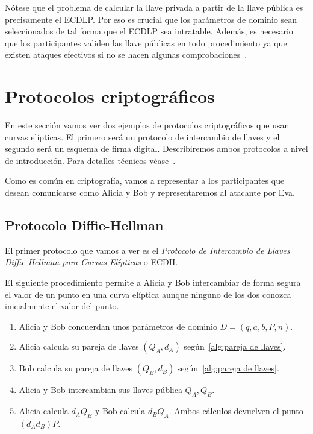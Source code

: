 Nótese que el problema de calcular la llave privada a partir de la llave pública es precisamente el ECDLP. Por eso es crucial que los parámetros de dominio sean seleccionados de tal forma que el ECDLP sea intratable. Además, es necesario que los participantes validen las llave públicas en todo procedimiento ya que existen ataques efectivos si no se hacen algunas comprobaciones~\cite[cap. 4]{Hankerson:2003}.

\section{Protocolos criptográficos}
\label{sec:Protocolos criptográficos}

En este sección vamos ver dos ejemplos de protocolos criptográficos que usan curvas elípticas. El primero será un protocolo de intercambio de llaves y el segundo será un esquema de firma digital. Describiremos ambos protocolos a nivel de introducción. Para detalles técnicos véase~\cite[cap. 4]{Hankerson:2003}.

Como es común en criptografía, vamos a representar a los participantes que desean comunicarse como Alicia y Bob y representaremos al atacante por Eva.

\subsection{Protocolo Diffie-Hellman}
\label{sub:Protocolo Diffie-Hellman}

El primer protocolo que vamos a ver es el \emph{Protocolo de Intercambio de Llaves Diffie-Hellman para Curvas Elípticas} o ECDH.

\begin{protocolo}[ECDH]\label{pc:diffie-hellman}
    El siguiente procedimiento permite a Alicia y Bob intercambiar de forma segura el valor de un punto en una curva elíptica aunque ninguno de los dos conozca inicialmente el valor del punto.

    \begin{enumerate}
        \item Alicia y Bob concuerdan unos parámetros de dominio $D = (q, a, b, P, n)$.
        \item Alicia calcula su pareja de llaves $(Q_A, d_A)$ según~\ref{alg:pareja de llaves}.
        \item Bob calcula su pareja de llaves $(Q_B, d_B)$ según~\ref{alg:pareja de llaves}.
        \item Alicia y Bob intercambian sus llaves pública $Q_A, Q_B$.
        \item Alicia calcula $d_A Q_B$ y Bob calcula $d_B Q_A$. Ambos cálculos devuelven el punto $(d_A d_B) P$.
    \end{enumerate}
\end{protocolo}

